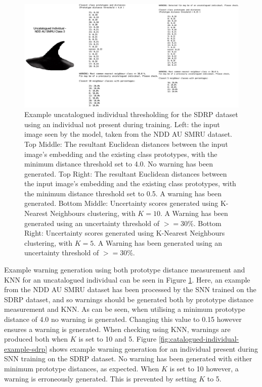 \begin{figure}[t]
	\begin{center}
		\includegraphics[width=0.9\linewidth]{Chapter6/figs/uncatalogued-individual-thresholding-updated.png}
	\end{center}
	\caption[Example uncatalogued individual thresholding for the SDRP dataset using an individual not present during training.]{Example uncatalogued individual thresholding for the SDRP dataset using an individual not present during training. Left: the input image seen by the model, taken from the NDD AU SMRU dataset.  Top Middle: The resultant Euclidean distances between the input image's embedding and the existing class prototypes, with the minimum distance threshold set to 4.0. No warning has been generated. Top Right: The resultant Euclidean distances between the input image's embedding and the existing class prototypes, with the minimum distance threshold set to 0.5. A warning has been generated. Bottom Middle: Uncertainty scores generated using K-Nearest Neighbours clustering, with $K = 10$. A Warning has been generated using an uncertainty threshold of $>=30\%$. Bottom Right: Uncertainty scores generated using K-Nearest Neighbours clustering, with $K = 5$. A Warning has been generated using an uncertainty threshold of $>=30\%$.}
	\label{fig:uncatalogued-individual-example-sdrp}
\end{figure}

Example warning generation using both prototype distance measurement and KNN for an uncatalogued individual can be seen in Figure \ref{fig:uncatalogued-individual-example-sdrp}. Here, an example from the NDD AU SMRU dataset has been processed by the SNN trained on the SDRP dataset, and so warnings should be generated both by prototype distance measurement and KNN. As can be seen, when utilising a minimum prototype distance of 4.0 no warning is generated. Changing this value to 0.15 however ensures a warning is generated. When checking using KNN, warnings are produced both when $K$ is set to 10 and 5. Figure \ref{fig:catalogued-individual-example-sdrp} shows example warning generation for an individual present during SNN training on the SDRP dataset. No warning has been generated with either minimum prototype distances, as expected. When $K$ is set to 10 however, a warning is erroneously generated. This is prevented by setting $K$ to 5. 

